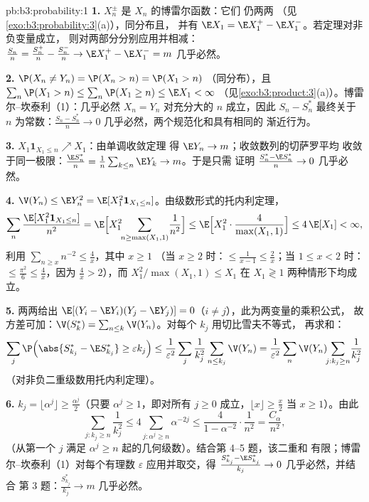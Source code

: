 \begin{solution}{pb:b3:probability:1}
\textbf{1.} $X_n^{\pm}$ 是 $X_n$ 的博雷尔函数：它们
仍两两
（见\cref{exo:b3:probability:3}(a)），同分布且，
并有 $\E X_1 = \E X_1^+ - \E
X_1^-$。若定理对非负变量成立，
则对两部分分别应用并相减：
$\frac{S_n}n = \frac{S_n^+}n - \frac{S_n^-}n \to \E X_1^+ -
\E X_1^- = m$ 几乎必然。

\textbf{2.} $\P(X_n \neq Y_n) = \P(X_n > n) = \P(X_1 > n)$
（同分布），且 $\sum_n\P(X_1 > n) \leq \sum_n\P(X_1
\geq n) \leq \E X_1 < \infty$
（见\cref{exo:b3:product:3}(a)）。博雷尔--坎泰利（1）：几乎必然
$X_n = Y_n$ 对充分大的 $n$ 成立，因此 $S_n - S_n^*$
最终关于 $n$ 为常数：$\frac{S_n - S_n^*}n \to 0$
几乎必然，两个规范化和具有相同的
渐近行为。

\textbf{3.} $X_1\mathbf 1_{X_1 \leq n} \nearrow X_1$：由单调收敛定理
得 $\E Y_n \to m$；收敛数列的切萨罗平均
收敛于同一极限：$\frac{\E S_n^*}n =
\frac1n\sum_{k\leq n}\E Y_k \to m$。于是只需
证明 $\frac{S^*_n - \E S^*_n}{n} \to 0$ 几乎必然。

\textbf{4.} $\V(Y_n) \leq \E Y_n^2 = \E[X_1^2\mathbf
1_{X_1\leq n}]$。由级数形式的托内利定理，
\[
\sum_n\frac{\E[X_1^2\mathbf 1_{X_1\leq n}]}{n^2}
= \E\Bigl[X_1^2\!\!\sum_{n \geq \max(X_1, 1)}\!\frac1{n^2}
\Bigr]
\leq \E\Bigl[X_1^2\cdot\frac{4}{\max(X_1,1)}\Bigr]
\leq 4\,\E[X_1] < \infty,
\]
利用 $\sum_{n\geq x}n^{-2} \leq \frac4x$，其中 $x \geq 1$
（当 $x \geq 2$ 时：$\leq \frac1{x-1} \leq \frac2x$；当 $1
\leq x < 2$ 时：$\leq \frac{\pi^2}6 \leq \frac4x$，因为
$\frac4x > 2$），而 $X_1^2/\max(X_1, 1) \leq X_1$ 在
$X_1 \gtrless 1$ 两种情形下均成立。

\textbf{5.} 两两给出 $\E[(Y_i - \E
Y_i)(Y_j - \E Y_j)] = 0$（$i \neq j$），此为两变量的乘积公式，
故方差可加：$\V(S^*_k) =
\sum_{n\leq k}\V(Y_n)$。对每个 $k_j$ 用切比雪夫不等式，
再求和：
\[
\sum_j\P\Bigl(\abs{S^*_{k_j} - \E S^*_{k_j}} \geq
\varepsilon k_j\Bigr)
\leq \frac1{\varepsilon^2}\sum_j\frac1{k_j^2}\sum_{n\leq
k_j}\V(Y_n)
= \frac1{\varepsilon^2}\sum_n\V(Y_n)\!\!\sum_{j : k_j\geq
n}\!\frac1{k_j^2}
\]
（对非负二重级数用托内利定理）。

\textbf{6.} $k_j = \lfloor\alpha^j\rfloor \geq
\frac{\alpha^j}2$（只要 $\alpha^j \geq 1$，即对所有
$j \geq 0$ 成立，$\lfloor x\rfloor \geq \frac x2$ 当 $x \geq
1$）。由此
\[
\sum_{j : k_j \geq n}\frac1{k_j^2}
\leq 4\sum_{j : \alpha^j \geq n}\alpha^{-2j}
\leq \frac{4}{1 - \alpha^{-2}}\cdot\frac1{n^2}
= \frac{C_\alpha}{n^2},
\]
（从第一个 $j$ 满足 $\alpha^j \geq
n$ 起的几何级数）。结合第 4--5 题，该二重和
有限；博雷尔--坎泰利（1）对每个有理数
$\varepsilon$ 应用并取交，得
$\frac{S^*_{k_j} - \E S^*_{k_j}}{k_j} \to 0$ 几乎必然，并结合
第 3 题：$\frac{S^*_{k_j}}{k_j} \to m$ 几乎必然。


\end{solution}
